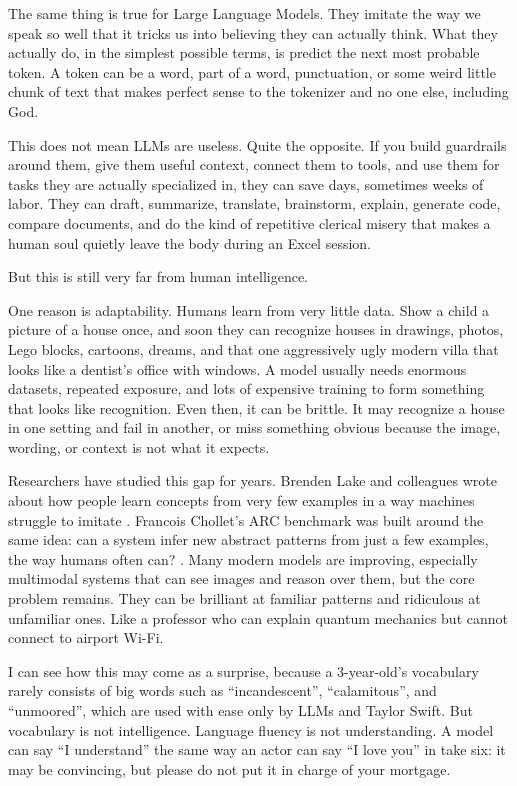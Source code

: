 \documentclass[12pt,oneside]{book}
\begin{document}
The same thing is true for Large Language Models. They imitate the way we speak so well that it tricks us into believing they can actually think. What they actually do, in the simplest possible terms, is predict the next most probable token. A token can be a word, part of a word, punctuation, or some weird little chunk of text that makes perfect sense to the tokenizer and no one else, including God.

This does not mean LLMs are useless. Quite the opposite. If you build guardrails around them, give them useful context, connect them to tools, and use them for tasks they are actually specialized in, they can save days, sometimes weeks of labor. They can draft, summarize, translate, brainstorm, explain, generate code, compare documents, and do the kind of repetitive clerical misery that makes a human soul quietly leave the body during an Excel session.

But this is still very far from human intelligence.

One reason is adaptability. Humans learn from very little data. Show a child a picture of a house once, and soon they can recognize houses in drawings, photos, Lego blocks, cartoons, dreams, and that one aggressively ugly modern villa that looks like a dentist's office with windows. A model usually needs enormous datasets, repeated exposure, and lots of expensive training to form something that looks like recognition. Even then, it can be brittle. It may recognize a house in one setting and fail in another, or miss something obvious because the image, wording, or context is not what it expects.

Researchers have studied this gap for years. Brenden Lake and colleagues wrote about how people learn concepts from very few examples in a way machines struggle to imitate \parencite{lake2017}. Francois Chollet's ARC benchmark was built around the same idea: can a system infer new abstract patterns from just a few examples, the way humans often can? \parencite{chollet2019}. Many modern models are improving, especially multimodal systems that can see images and reason over them, but the core problem remains. They can be brilliant at familiar patterns and ridiculous at unfamiliar ones. Like a professor who can explain quantum mechanics but cannot connect to airport Wi-Fi.

I can see how this may come as a surprise, because a 3-year-old's vocabulary rarely consists of big words such as ``incandescent'', ``calamitous'', and ``unmoored'', which are used with ease only by LLMs and Taylor Swift. But vocabulary is not intelligence. Language fluency is not understanding. A model can say ``I understand'' the same way an actor can say ``I love you'' in take six: it may be convincing, but please do not put it in charge of your mortgage.
\end{document}
